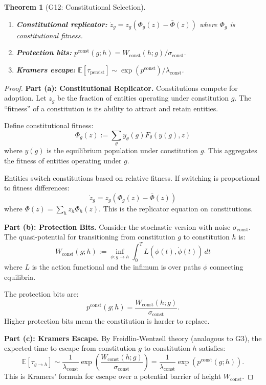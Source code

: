 \documentclass[12pt]{article}
\newtheorem{theorem}{Theorem}[section]
\newcommand{\E}{\mathbb{E}}
\begin{document}
\begin{theorem}[G12: Constitutional Selection]
\label{thm:g12}
\begin{enumerate}
    \item[(a)] \textbf{Constitutional replicator:} $\dot{z}_g = z_g(\Phi_g(z) - \bar{\Phi}(z))$ where $\Phi_g$ is constitutional fitness.
    \item[(b)] \textbf{Protection bits:} $p^{\mathrm{const}}(g; h) = W_{\mathrm{const}}(h; g) / \sigma_{\mathrm{const}}$.
    \item[(c)] \textbf{Kramers escape:} $\E[\tau_{\mathrm{persist}}] \sim \exp(p^{\mathrm{const}}) / \lambda_{\mathrm{const}}$.
\end{enumerate}
\end{theorem}

\begin{proof}
\textbf{Part (a): Constitutional Replicator.}
Constitutions compete for adoption. Let $z_g$ be the fraction of entities operating under constitution $g$. The ``fitness'' of a constitution is its ability to attract and retain entities.

Define constitutional fitness:
\[
\Phi_g(z) := \sum_\theta y_\theta(g) F_\theta(y(g), z)
\]
where $y(g)$ is the equilibrium population under constitution $g$. This aggregates the fitness of entities operating under $g$.

Entities switch constitutions based on relative fitness. If switching is proportional to fitness differences:
\[
\dot{z}_g = z_g (\Phi_g(z) - \bar{\Phi}(z))
\]
where $\bar{\Phi}(z) = \sum_h z_h \Phi_h(z)$. This is the replicator equation on constitutions.

\textbf{Part (b): Protection Bits.}
Consider the stochastic version with noise $\sigma_{\text{const}}$. The quasi-potential for transitioning from constitution $g$ to constitution $h$ is:
\[
W_{\text{const}}(g; h) := \inf_{\phi: g \to h} \int_0^T L(\phi(t), \dot{\phi}(t)) \, dt
\]
where $L$ is the action functional and the infimum is over paths $\phi$ connecting equilibria.

The protection bits are:
\[
p^{\text{const}}(g; h) = \frac{W_{\text{const}}(h; g)}{\sigma_{\text{const}}}.
\]
Higher protection bits mean the constitution is harder to replace.

\textbf{Part (c): Kramers Escape.}
By Freidlin-Wentzell theory (analogous to G3), the expected time to escape from constitution $g$ to constitution $h$ satisfies:
\[
\E[\tau_{g \to h}] \sim \frac{1}{\lambda_{\text{const}}} \exp\left( \frac{W_{\text{const}}(h; g)}{\sigma_{\text{const}}} \right) = \frac{1}{\lambda_{\text{const}}} \exp(p^{\text{const}}(g; h)).
\]
This is Kramers' formula for escape over a potential barrier of height $W_{\text{const}}$.
\end{proof}
\end{document}
